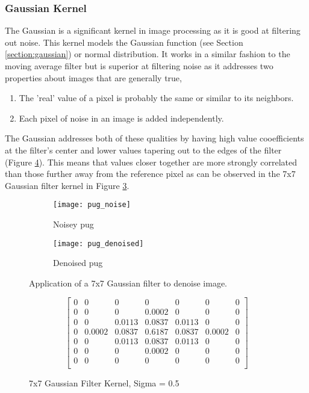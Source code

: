 \subsubsection{Gaussian Kernel}
\label{subsubsection:gauss_kernel}
The Gaussian is a significant kernel in image processing as it is good at filtering out noise. This kernel models the Gaussian function (see Section \ref{section:gaussian}) or normal distribution. It works in a similar fashion to the moving average filter but is superior at filtering noise as it addresses two properties about images that are generally true, 

\begin{enumerate}
    \item The 'real' value of a pixel is probably the same or similar to its neighbors. 
    \item Each pixel of noise in an image is added independently.
\end{enumerate}

The Gaussian addresses both of these qualities by having high value cooefficients at the filter's center and lower values tapering out to the edges of the filter (Figure \ref{fig:gauss_kernel}). This means that values closer together are more strongly correlated than those further away from the reference pixel as can be observed in the 7x7 Gaussian filter kernel in Figure \ref{fig:pug_noise}.

\begin{figure}[H]
    \centering
    \begin{subfigure}[b]{0.3\textwidth}
        \texttt{[image: pug\_noise]}
        \caption{Noisey pug}
        \label{fig:pug_noise}
    \end{subfigure}
    \begin{subfigure}[b]{0.3\textwidth}
        \texttt{[image: pug\_denoised]}
        \caption{Denoised pug}
        \label{fig:pug_denoised}
    \end{subfigure}
    \caption{Application of a 7x7 Gaussian filter to denoise image.}
    \label{fig:pug_noise}
\end{figure}


\begin{figure}[H]
    \centering
    \[
    \begin{bmatrix}
       0 & 0 & 0 & 0 & 0 & 0 & 0 \\
       0 & 0 & 0 & 0.0002 & 0 & 0 & 0 \\
       0 & 0 & 0.0113  & 0.0837 & 0.0113  & 0 & 0 \\
       0 & 0.0002 & 0.0837 & 0.6187 & 0.0837 & 0.0002 & 0 \\
       0 & 0 & 0.0113 & 0.0837 & 0.0113 & 0 & 0 \\
       0 & 0 & 0 & 0.0002 & 0 & 0 & 0 \\
       0 & 0 & 0 & 0 & 0 & 0 & 0 \\
    \end{bmatrix}
    \]
    \caption{7x7 Gaussian Filter Kernel, Sigma = 0.5}
    \label{fig:gauss_kernel}
\end{figure}